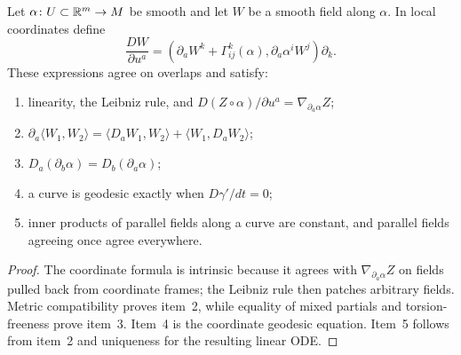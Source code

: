 \begin{lemma}
\label{lem:covariant-derivative-along-maps}





Let $\alpha\colon U\subset\mathbb{R}^m\to M$ be smooth and let $W$ be a
smooth field along $\alpha$. In local coordinates define
$$\frac{DW}{\partial u^a}
=\left(\partial_aW^k+\Gamma^k_{ij}(\alpha),
\partial_a\alpha^iW^j\right)\partial_k.$$
These expressions agree on overlaps and satisfy:
\begin{enumerate}
\item linearity, the Leibniz rule, and
$D(Z\circ\alpha)/\partial u^a=\nabla_{\partial_a\alpha}Z$;
\item
$\partial_a\langle W_1,W_2\rangle
=\langle D_aW_1,W_2\rangle+\langle W_1,D_aW_2\rangle$;
\item $D_a(\partial_b\alpha)=D_b(\partial_a\alpha)$;
\item a curve is geodesic exactly when $D\gamma'/dt=0$;
\item inner products of parallel fields along a curve are constant, and
parallel fields agreeing once agree everywhere.
\end{enumerate}
\end{lemma}
\begin{proof}
\sketch

The coordinate formula is intrinsic because it agrees with
$\nabla_{\partial_a\alpha}Z$ on fields pulled back from coordinate
frames; the Leibniz rule then patches arbitrary fields. Metric
compatibility proves item~2, while equality of mixed partials and
torsion-freeness prove item~3. Item~4 is the coordinate geodesic
equation. Item~5 follows from item~2 and uniqueness for the resulting
linear ODE.
\end{proof}

